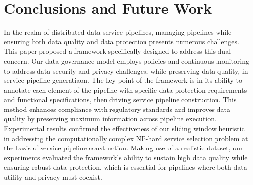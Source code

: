\documentclass[sn-mathphys-num,referee]{sn-jnl}
\theoremstyle{definition}
\begin{document}
\section{Conclusions and Future Work}\label{sec:conclusions}
In the realm of distributed data service pipelines, managing pipelines while ensuring both data quality and data protection presents numerous challenges. This paper proposed a framework specifically designed to address this dual concern. Our data governance model employs policies and continuous monitoring to address data security and privacy challenges, while preserving data quality, in service pipeline generatiaon. The key point of the framework is in its ability to annotate each element of the pipeline with specific data protection requirements and functional specifications, then driving service pipeline construction. This method enhances compliance with regulatory standards and improves data quality by preserving maximum information across pipeline execution. Experimental results confirmed the effectiveness of our sliding window heuristic in addressing the computationally complex NP-hard service selection problem at the basis of service pipeline construction. Making use of a realistic dataset, our experiments evaluated the framework's ability to sustain high data quality while ensuring robust data protection, which is essential for pipelines where both data utility and privacy must coexist.
\end{document}
